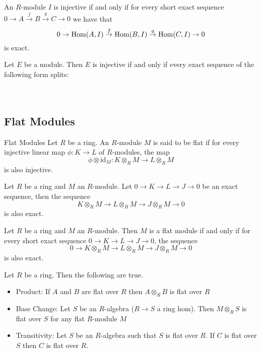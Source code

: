 \documentclass[a4paper]{article}
\begin{document}
\begin{thm}{}{} An $R$-module $I$ is injective if and only if for every short exact sequence $0\to A\overset{f}{\to}B\overset{g}{\to}C\to 0$ we have that $$0\to \operatorname{Hom}(A,I)\overset{f}{\to}\operatorname{Hom}(B,I)\overset{g}{\to}\operatorname{Hom}(C,I)\to 0$$
is exact. 
\end{thm}

\begin{prp}{}{} Let $E$ be a module. Then $E$ is injective if and only if every exact sequence of the following form splits: \\~\\
 \\
\end{prp}

\subsection{Flat Modules}
\begin{defn}{Flat Modules}{} Let $R$ be a ring. An $R$-module $M$ is said to be flat if for every injective linear map $\phi:K\to L$ of $R$-modules, the map $$\phi\otimes\text{id}_M:K\otimes_RM\to L\otimes_RM$$ is also injective. 
\end{defn}

\begin{thm}{}{} Let $R$ be a ring and $M$ an $R$-module. Let $0\to K\to L\to J\to 0$ be an exact sequence, then the sequence $$K\otimes_RM\to L\otimes_RM\to J\otimes_RM\to 0$$ is also exact. 
\end{thm}

\begin{thm}{}{} Let $R$ be a ring and $M$ an $R$-module. Then $M$ is a flat module if and only if for every short exact sequence $0\to K\to L\to J\to 0$, the sequence $$0\to K\otimes_RM\to L\otimes_RM\to J\otimes_RM\to 0$$ is also exact. 
\end{thm}

\begin{thm}{}{} Let $R$ be a ring. Then the following are true. 
\begin{itemize}
\item Product: If $A$ and $B$ are flat over $R$ then $A\otimes_R B$ is flat over $R$
\item Base Change: Let $S$ be an $R$-algebra ($R\to S$ a ring hom). Then $M\otimes_RS$ is flat over $S$ for any flat $R$-module $M$
\item Transitivity: Let $S$ be an $R$-algebra such that $S$ is flat over $R$. If $C$ is flat over $S$ then $C$ is flat over $R$. 
\end{itemize}
\end{thm}
\end{document}
